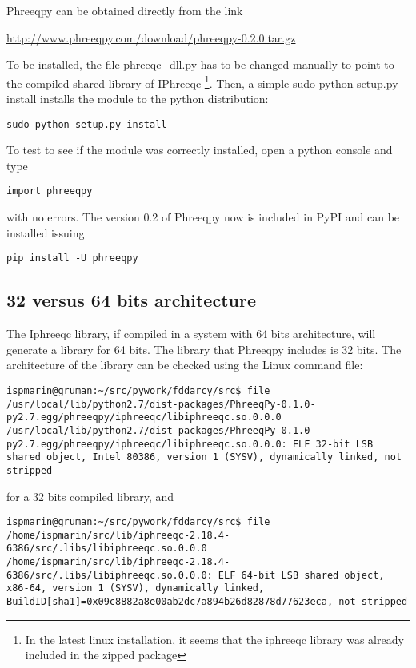 \documentclass[12pt,a4paper,twoside]{report}
\begin{document}
Phreeqpy can be obtained directly from the link

\url{http://www.phreeqpy.com/download/phreeqpy-0.2.0.tar.gz}

To be installed, the file phreeqc\_dll.py has to be changed manually to point to the compiled shared library of IPhreeqc \footnote{In the latest linux installation, it seems that the iphreeqc library was already included in the zipped package}. Then, a simple sudo python setup.py install installs the module to the python distribution:

\begin{lstlisting}[style=Bash]
sudo python setup.py install
\end{lstlisting}

To test to see if the module was correctly installed, open a python console and type

\begin{lstlisting}[style=Bash]
import phreeqpy
\end{lstlisting}
with no errors. The version 0.2 of Phreeqpy now is included in PyPI and can be installed issuing

\begin{lstlisting}[style=Bash]
pip install -U phreeqpy
\end{lstlisting}


\subsection*{32 versus 64 bits architecture}
The Iphreeqc library, if compiled in a system with 64 bits architecture, will generate a library for 64 bits. The library that Phreeqpy includes is 32 bits. The architecture of the library can be checked using the Linux command file:

\begin{lstlisting}[style=Bash]
ispmarin@gruman:~/src/pywork/fddarcy/src$ file /usr/local/lib/python2.7/dist-packages/PhreeqPy-0.1.0-py2.7.egg/phreeqpy/iphreeqc/libiphreeqc.so.0.0.0
/usr/local/lib/python2.7/dist-packages/PhreeqPy-0.1.0-py2.7.egg/phreeqpy/iphreeqc/libiphreeqc.so.0.0.0: ELF 32-bit LSB shared object, Intel 80386, version 1 (SYSV), dynamically linked, not stripped
\end{lstlisting}

for a 32 bits compiled library, and 

\begin{lstlisting}[style=Bash]
ispmarin@gruman:~/src/pywork/fddarcy/src$ file /home/ispmarin/src/lib/iphreeqc-2.18.4-6386/src/.libs/libiphreeqc.so.0.0.0
/home/ispmarin/src/lib/iphreeqc-2.18.4-6386/src/.libs/libiphreeqc.so.0.0.0: ELF 64-bit LSB shared object, x86-64, version 1 (SYSV), dynamically linked, BuildID[sha1]=0x09c8882a8e00ab2dc7a894b26d82878d77623eca, not stripped
\end{lstlisting}
\end{document}
